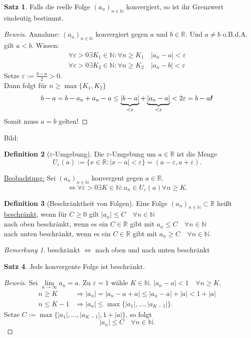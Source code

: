 \documentclass[12pt,a4paper,titlepage]{article} %
\theoremstyle{definition}
\newtheorem{satz}{Satz}[subsection]
\newtheorem{defi}[satz]{Definition}
\theoremstyle{remark}
\newtheorem*{bem}{Bemerkung}
\newenvironment{bew}{\begin{proof}[Beweis]}{\end{proof}}
\newcommand{\N}{\mathbb{N}}
\newcommand{\R}{\mathbb{R}}
\begin{document}
\begin{satz}
	Falls die reelle Folge $(a_n)_{n\in\N}$ konvergiert, so ist ihr Grenzwert eindeutig bestimmt.
\end{satz}
\begin{bew}
	Annahme: $(a_n)_{n\in\N}$ konvergiert gegen $a$ und $b\in\R$. Und $a\neq b$ o.B.d.A. gilt $a<b$.
	Wissen: 
	\begin{align*}
		\forall \varepsilon>0\exists K_1\in\N: \forall n\geq K_1 \quad |a_n -a| <\varepsilon\\
		\forall \varepsilon>0\exists K_2\in\N: \forall n\geq K_2 \quad |a_n -b| <\varepsilon
	\end{align*}
	Setze $\varepsilon:=\frac{b-a}{2} >0$.\\
	Dann folgt für $n\geq \max \{K_1,K_2\}$
	$$b-a = b-a_n + a_n -a \leq \underbrace{|b-a|}_{<\varepsilon} + \underbrace{|a_n-a|}_{<\varepsilon} < 2\varepsilon = b-a \text{\Lightning}$$
	Somit muss $a=b$ gelten!
\end{bew}
Bild: %
\begin{defi}[$\varepsilon$-Umgebung]
	Die $\varepsilon$-Umgebung um $a\in\R$ ist die Menge
	$$U_\varepsilon(a):= \{x\in\R: |x-a| <\varepsilon\} = (a-\varepsilon, a+\varepsilon).$$
\end{defi}
\underline{Beobachtung:} Sei $(a_n)_{n\in\N}$ konvergent gegen $a\in\R$.
$$\Leftrightarrow \forall\varepsilon >0 \exists K\in\N: a_n \in U_\varepsilon(a) \forall n\geq K.$$
\begin{defi}[Beschränktheit von Folgen]
	Eine Folge $(a_n)_{n\in\N} \subset \R$ heißt \underline{beschränkt}, wenn für $C\geq 0$ gilt $|a_n|\leq C \quad \forall n\in\N$\\
	nach oben beschränkt, wenn es ein $C\in\R$ gibt mit $a_n\leq C \quad \forall n\in\N$\\
	nach unten beschränkt, wenn es ein $C\in\R$ gibt mit $a_n\geq C \quad \forall n\in\N$.
\end{defi}
\begin{bem}
	beschränkt $\Leftrightarrow$ nach oben und nach unten beschränkt
\end{bem}
\begin{satz}
	Jede konvergente Folge ist beschränkt.
\end{satz}
\begin{bew}
	Sei $\lim\limits_{n\rightarrow\infty} a_n = a$. Zu $\varepsilon = 1$ wähle $K\in\N$.
	$|a_n-a|<1 \quad \forall n\geq K$.
	\begin{align*}
		n\geq K &\Rightarrow |a_n| = |a_n -a+a| \leq |a_n -a| + |a| < 1 + |a|\\
		n\leq K-1 &\Rightarrow |a_n| \leq \max\{|a_1|,\ldots,|a_{K-1}|\}.
	\end{align*}
	Setze $C:= \max\{|a_1|,\ldots,|a_{K-1}|, 1 + |a|\}$, so folgt
	$$|a_n| \leq C \quad\forall n\in\N.$$
\end{bew}
\end{document}

